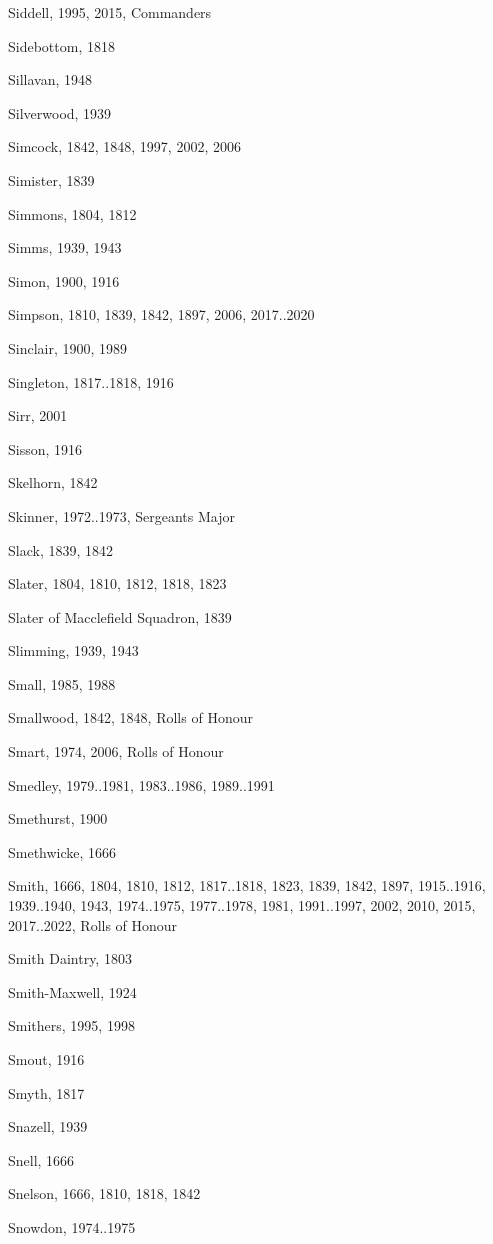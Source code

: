 {\begin{theindex}
\item Siddell, 1995, 2015, Commanders
\item Sidebottom, 1818
\item Sillavan, 1948
\item Silverwood, 1939
\item Simcock, 1842, 1848, 1997, 2002, 2006
\item Simister, 1839
\item Simmons, 1804, 1812
\item Simms, 1939, 1943
\item Simon, 1900, 1916
\item Simpson, 1810, 1839, 1842, 1897, 2006, 2017..2020
\item Sinclair, 1900, 1989
\item Singleton, 1817..1818, 1916
\item Sirr, 2001
\item Sisson, 1916
\item Skelhorn, 1842
\item Skinner, 1972..1973, Sergeants Major
\item Slack, 1839, 1842
\item Slater, 1804, 1810, 1812, 1818, 1823
\item Slater of Macclefield Squadron, 1839
\item Slimming, 1939, 1943
\item Small, 1985, 1988
\item Smallwood, 1842, 1848, Rolls of Honour
\item Smart, 1974, 2006, Rolls of Honour
\item Smedley, 1979..1981, 1983..1986, 1989..1991
\item Smethurst, 1900
\item Smethwicke, 1666
\item Smith, 1666, 1804, 1810, 1812, 1817..1818, 1823, 1839, 1842, 1897, 1915..1916, 1939..1940, 1943, 1974..1975, 1977..1978, 1981, 1991..1997, 2002, 2010, 2015, 2017..2022, Rolls of Honour
\item Smith Daintry, 1803
\item Smith-Maxwell, 1924
\item Smithers, 1995, 1998
\item Smout, 1916
\item Smyth, 1817
\item Snazell, 1939
\item Snell, 1666
\item Snelson, 1666, 1810, 1818, 1842
\item Snowdon, 1974..1975

\end{theindex}}
